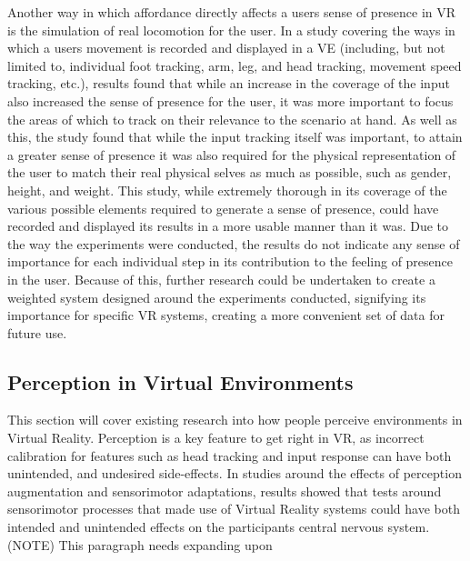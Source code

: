 		Another way in which affordance directly affects a users sense of presence in VR is the simulation of real locomotion for the user. In a study \cite{Turchet2015} covering the ways in which a users movement is recorded and displayed in a VE (including, but not limited to, individual foot tracking, arm, leg, and head tracking, movement speed tracking, etc.), results found that while an increase in the coverage of the input also increased the sense of presence for the user, it was more important to focus the areas of which to track on their relevance to the scenario at hand. As well as this, the study found that while the input tracking itself was important, to attain a greater sense of presence it was also required for the physical representation of the user to match their real physical selves as much as possible, such as gender, height, and weight.
		This study, while extremely thorough in its coverage of the various possible elements required to generate a sense of presence, could have recorded and displayed its results in a more usable manner than it was. Due to the way the experiments were conducted, the results do not indicate any sense of importance for each individual step in its contribution to the feeling of presence in the user. Because of this, further research could be undertaken to create a weighted system designed around the experiments conducted, signifying its importance for specific VR systems, creating a more convenient set of data for future use.
		
	\subsection{Perception in Virtual Environments}
	\label{lr:vr:perception}
		This section will cover existing research into how people perceive environments in Virtual Reality.
		Perception is a key feature to get right in VR, as incorrect calibration for features such as head tracking and input response can have both unintended, and undesired side-effects. In studies \cite{Wright2006}  \cite{Wright2009} \cite{Wright2011} \cite{Wright2013} \cite{Wright2014} around the effects of perception augmentation and sensorimotor adaptations, results showed that tests around sensorimotor processes that made use of Virtual Reality systems could have both intended and unintended effects on the participants central nervous system. 
		(NOTE) This paragraph needs expanding upon
		

